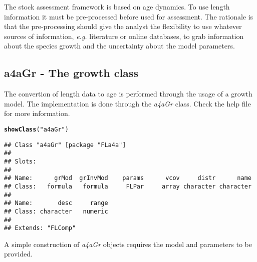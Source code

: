 \documentclass[a4paper,english,10pt]{article}\usepackage[]{graphicx}\usepackage[]{color}
\makeatletter
\newcommand{\hlstr}[1]{\textcolor[rgb]{0.192,0.494,0.8}{#1}}%
\newcommand{\hlstd}[1]{\textcolor[rgb]{0.345,0.345,0.345}{#1}}%
\newcommand{\hlkwd}[1]{\textcolor[rgb]{0.737,0.353,0.396}{\textbf{#1}}}%
\newenvironment{kframe}{%
 \def\at@end@of@kframe{}%
 \ifinner\ifhmode%
  \def\at@end@of@kframe{\end{minipage}}%
  \begin{minipage}{\columnwidth}%
 \fi\fi%
 \def\FrameCommand##1{\hskip\@totalleftmargin \hskip-\fboxsep
 \colorbox{shadecolor}{##1}\hskip-\fboxsep
     \hskip-\linewidth \hskip-\@totalleftmargin \hskip\columnwidth}%
 \MakeFramed {\advance\hsize-\width
   \@totalleftmargin\z@ \linewidth\hsize
   \@setminipage}}%
 {\par\unskip\endMakeFramed%
 \at@end@of@kframe}
\newenvironment{knitrout}{}{} %
\makeatother
\begin{document}
The stock assessment framework is based on age dynamics. To use length information it must be pre-processed before used for assessment. The rationale is that the pre-processing should give the analyst the flexibility to use whatever sources of information, \emph{e.g.} literature or online databases, to grab information about the species growth and the uncertainty about the model parameters.

\subsection{a4aGr - The growth class}

The convertion of length data to age is performed through the usage of a growth model. The implementation is done through the \emph{a4aGr} class. Check the help file for more information.

\begin{knitrout}
\color{fgcolor}\begin{kframe}
\begin{alltt}
\hlkwd{showClass}\hlstd{(}\hlstr{"a4aGr"}\hlstd{)}
\end{alltt}
\begin{verbatim}
## Class "a4aGr" [package "FLa4a"]
## 
## Slots:
##                                                                   
## Name:      grMod  grInvMod    params      vcov     distr      name
## Class:   formula   formula     FLPar     array character character
##                           
## Name:       desc     range
## Class: character   numeric
## 
## Extends: "FLComp"
\end{verbatim}
\end{kframe}
\end{knitrout}


A simple construction of \emph{a4aGr} objects requires the model and parameters to be provided.
\end{document}
